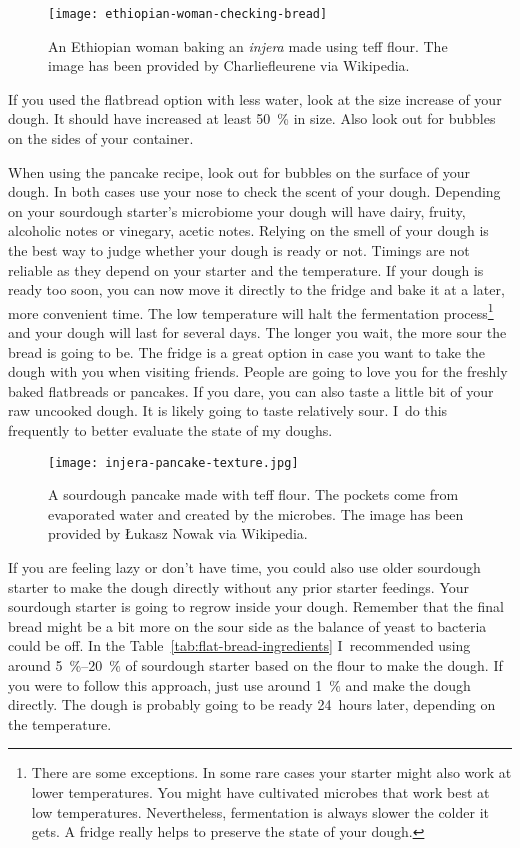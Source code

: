 \begin{figure}[htb]
\centering
  \texttt{[image: ethiopian-woman-checking-bread]}
  \caption[Ethiopian \emph{injera}]{An Ethiopian woman baking an \emph{injera}
      made using teff flour.  The image has been provided by Charliefleurene
      via Wikipedia.}
\end{figure}

If you used the flatbread option with less water, look at the size increase
of your dough. It should have increased at least \qty{50}{\percent} in size.
Also look out for bubbles on the sides of your container.

When using the pancake recipe, look out for bubbles on the surface of your dough.
In both cases use your nose to check the scent of your dough. Depending
on your sourdough starter's microbiome your dough will have
dairy, fruity, alcoholic notes or vinegary, acetic notes. Relying
on the smell of your dough is the best way to judge whether your
dough is ready or not. Timings are not reliable as they
depend on your starter and the temperature. If your dough
is ready too soon, you can now move it directly to the fridge and bake
it at a later, more convenient time. The low temperature will halt the fermentation
process\footnote{There are some exceptions. In some rare cases your starter
might also work at lower temperatures. You might have cultivated microbes that work best at
low temperatures. Nevertheless, fermentation
is always slower the colder it gets. A fridge really helps to preserve the state
of your dough.}
and your dough will last for several days. The longer you wait, the more sour the
bread is going to be. The fridge is a great option in case you want to
take the dough with you when visiting friends. People are going
to love you for the freshly baked flatbreads or pancakes. If you dare,
you can also taste a little bit of your raw uncooked dough. It is likely
going to taste relatively sour. I~do this frequently to better evaluate the
state of my doughs.

\begin{figure}[!htb]
\centering
  \texttt{[image: injera-pancake-texture.jpg]}
  \caption[Teff sourdough pancake]{A sourdough pancake made with teff flour.
      The pockets come from evaporated water and  created by the
      microbes.  The image has been provided by Łukasz Nowak via Wikipedia.}
\end{figure}

If you are feeling lazy or don't have time, you could also use older sourdough starter
to make the dough directly without any prior starter feedings. Your sourdough starter
is going to regrow inside your dough. Remember that the
final bread might be a bit more on the sour side as the balance of yeast to
bacteria could be off. In the Table~\ref{tab:flat-bread-ingredients}
I~recommended using around \qtyrange{5}{20}{\percent}
of sourdough starter based on the flour to make the dough. If you were to follow
this approach, just use around \qty{1}{\percent} and make the dough directly.
The dough is probably going to be ready 24~hours later, depending on the temperature.

